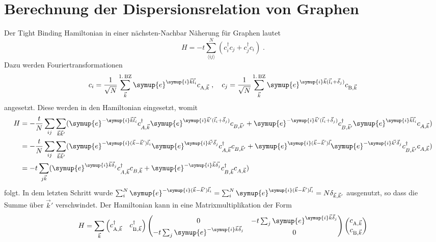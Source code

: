\section{Berechnung der Dispersionsrelation von Graphen}
\label{sec:calc_dispersion}
Der Tight Binding Hamiltonian in einer nächsten-Nachbar Näherung für Graphen lautet
\begin{equation*}
   H= - t \sum_{\langle ij \rangle }^N \left ( c_i^\dagger c_j + c_j^\dagger c_i \right ) \; .
\end{equation*}
Dazu werden Fouriertransformationen 
\begin{equation*}
    c_i = \frac{1}{\sqrt{N}} \sum_{\vec{k}}^{1. \, \text{BZ}} \symup{e}^{\symup{i}\vec{k}\vec{l}_i} c_{\text{A}, \vec{k}} \; , 
    \quad c_j = \frac{1}{\sqrt{N}} \sum_{\vec{k}}^{1. \, \text{BZ}} \symup{e}^{\symup{i}\vec{k}(\vec{l}_i+\vec{\delta}_j)} c_{\text{B}, \vec{k}}
\end{equation*}
angesetzt. 
Diese werden in den Hamiltonian eingesetzt, womit 
\begin{align*}
    H &= -\frac{t}{N} \sum_{ij} \sum_{\vec{k}\vec{k}'} ( \symup{e}^{-\symup{i}\vec{k}\vec{l}_i}c^\dagger_{A,\vec{k}} 
    \symup{e}^{\symup{i}\vec{k}'(\vec{l}_i+\vec{\delta}_j)}c_{B,\vec{k}'} + \symup{e}^{-\symup{i}\vec{k}'(\vec{l}_i+\vec{\delta}_j)} c^\dagger_{B,\vec{k}'} 
    \symup{e}^{\symup{i}\vec{k}\vec{l}_i}c_{A,\vec{k}}) \\
    &= -\frac{t}{N} \sum_{ij} \sum_{\vec{k}\vec{k}'} ( \symup{e}^{-\symup{i}(\vec{k}- \vec{k}')\vec{l}_i}\symup{e}^{\symup{i}\vec{k'}\vec{\delta}_j}c^\dagger_{A,\vec{k}} c_{B,\vec{k}'} + 
    \symup{e}^{\symup{i}(\vec{k}- \vec{k}')\vec{l}} \symup{e}^{-\symup{i}\vec{k'}\vec{\delta}_j} c^\dagger_{B,\vec{k}'}c_{A,\vec{k}}) \\
    &= -t \sum_{j\vec{k}} ( \symup{e}^{\symup{i}\vec{k}\vec{\delta}_j}c^\dagger_{A,\vec{k}} c_{B,\vec{k}} + 
    \symup{e}^{-\symup{i}\vec{k}\vec{\delta_j}} c^\dagger_{B,\vec{k}}c_{A,\vec{k}})
\end{align*}
folgt.
In dem letzten Schritt wurde $\sum_{i}^N \symup{e}^{-\symup{i}(\vec{k}- \vec{k}')\vec{l}_i} 
= \sum_{i}^N \symup{e}^{\symup{i}(\vec{k}- \vec{k}')\vec{l}_i} = N\delta_{\vec{k}, \vec{k}'}$ ausgenutzt, so dass die Summe über $\vec{k}'$ verschwindet.
Der Hamiltonian kann in eine Matrixmultiplikation der Form 
\begin{equation*}
    H = \sum_{\vec{k}} \begin{pmatrix}
        c_{\text{A},\vec{k}}^{\dagger} & c_{\text{B},\vec{k}}^{\dagger}
    \end{pmatrix}
    \begin{pmatrix}
        0 & -t\sum_{j} \symup{e}^{\symup{i}\vec{k}\vec{\delta}_j}     \\
        -t\sum_{j} \symup{e}^{-\symup{i}\vec{k}\vec{\delta}_j} & 0     
    \end{pmatrix}
    \begin{pmatrix}
        c_{\text{A},\vec{k}} \\
        c_{\text{B},\vec{k}}
    \end{pmatrix}
\end{equation*}
